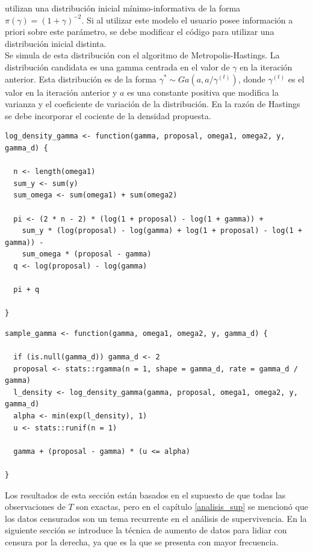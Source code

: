 \documentclass[11pt,a4paper]{article}
\begin{document}
\citet{nieto} utilizan una distribución inicial mínimo-informativa de la forma $\pi(\gamma) = (1+\gamma)^{-2}$. Si al utilizar este modelo el usuario posee información a priori sobre este parámetro, se debe modificar el código para utilizar una distribución inicial distinta.\\

Se simula de esta distribución con el algoritmo de Metropolis-Hastings. La distribución candidata es una gamma centrada en el valor de $\gamma$ en la iteración anterior. Esta distribución es de la forma $\gamma^* \sim Ga(a, a/\gamma^{(t)})$, donde $\gamma^{(t)}$ es el valor en la iteración anterior y $a$ es una constante positiva que modifica la varianza y el coeficiente de variación de la distribución. En la razón de Hastings se debe incorporar el cociente de la densidad propuesta.\\

\newpage

\begin{lstlisting}
log_density_gamma <- function(gamma, proposal, omega1, omega2, y, gamma_d) {

  n <- length(omega1)
  sum_y <- sum(y)
  sum_omega <- sum(omega1) + sum(omega2)

  pi <- (2 * n - 2) * (log(1 + proposal) - log(1 + gamma)) +
    sum_y * (log(proposal) - log(gamma) + log(1 + proposal) - log(1 + gamma)) -
    sum_omega * (proposal - gamma)
  q <- log(proposal) - log(gamma)

  pi + q

}
\end{lstlisting}

\begin{lstlisting}
sample_gamma <- function(gamma, omega1, omega2, y, gamma_d) {

  if (is.null(gamma_d)) gamma_d <- 2
  proposal <- stats::rgamma(n = 1, shape = gamma_d, rate = gamma_d / gamma)
  l_density <- log_density_gamma(gamma, proposal, omega1, omega2, y, gamma_d)
  alpha <- min(exp(l_density), 1)
  u <- stats::runif(n = 1)

  gamma + (proposal - gamma) * (u <= alpha)

}
\end{lstlisting} \leavevmode\newline

Los resultados de esta sección están basados en el supuesto de que todas las observaciones de $T$ son exactas, pero  en el capítulo \ref{analisis_sup} se mencionó que los datos censurados son un tema recurrente en el análisis de supervivencia. En la siguiente sección se introduce la técnica de aumento de datos para lidiar con censura por la derecha, ya que es la que se presenta con mayor frecuencia.\\
\end{document}

